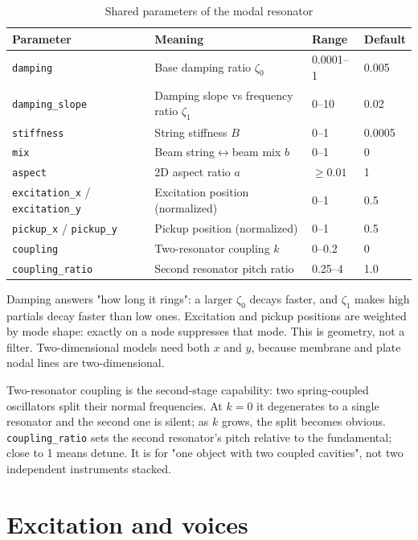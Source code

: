 \begin{table}[htbp]
\centering
\small
\begin{tabular}{@{}llll@{}}
\hline
Parameter & Meaning & Range & Default \\
\hline
\texttt{damping} & Base damping ratio $\zeta_0$ & 0.0001–1 & 0.005 \\
\texttt{damping\_slope} & Damping slope vs frequency ratio $\zeta_1$ & 0–10 & 0.02 \\
\texttt{stiffness} & String stiffness $B$ & 0–1 & 0.0005 \\
\texttt{mix} & Beam string$\leftrightarrow$beam mix $b$ & 0–1 & 0 \\
\texttt{aspect} & 2D aspect ratio $a$ & $\ge0.01$ & 1 \\
\texttt{excitation\_x} / \texttt{excitation\_y} & Excitation position (normalized) & 0–1 & 0.5 \\
\texttt{pickup\_x} / \texttt{pickup\_y} & Pickup position (normalized) & 0–1 & 0.5 \\
\texttt{coupling} & Two-resonator coupling $k$ & 0–0.2 & 0 \\
\texttt{coupling\_ratio} & Second resonator pitch ratio & 0.25–4 & 1.0 \\
\hline
\end{tabular}
\caption{Shared parameters of the modal resonator}
\label{tab:modal-params}
\end{table}

Damping answers "how long it rings": a larger $\zeta_0$ decays faster, and $\zeta_1$ makes high partials decay faster than low ones. Excitation and pickup positions are weighted by mode shape: exactly on a node suppresses that mode. This is geometry, not a filter. Two-dimensional models need both $x$ and $y$, because membrane and plate nodal lines are two-dimensional.

Two-resonator coupling is the second-stage capability: two spring-coupled oscillators split their normal frequencies. At $k=0$ it degenerates to a single resonator and the second one is silent; as $k$ grows, the split becomes obvious. \texttt{coupling\_ratio} sets the second resonator's pitch relative to the fundamental; close to 1 means detune. It is for "one object with two coupled cavities", not two independent instruments stacked.

\section{Excitation and voices}

